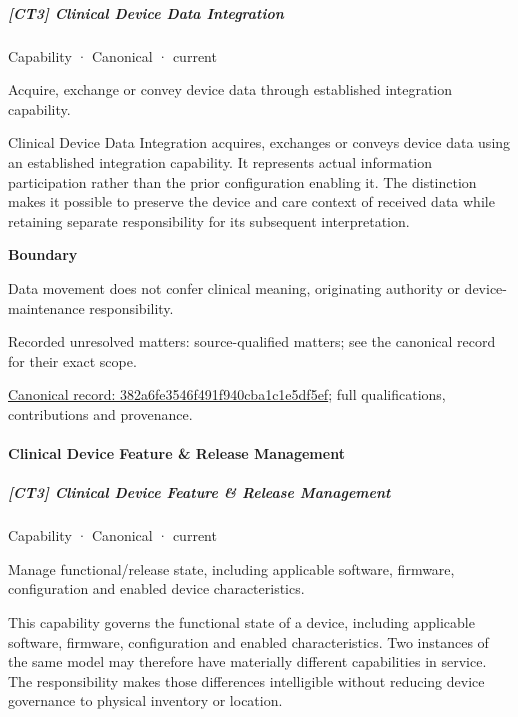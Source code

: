 \subparagraph{[CT3] Clinical Device Data Integration}

\label{element:382a6fe3546f491f940cba1c1e5df5ef}
{\small Capability · Canonical · current}\par

Acquire, exchange or convey device data through established integration capability.



Clinical Device Data Integration acquires, exchanges or conveys device data using an established integration capability. It represents actual information participation rather than the prior configuration enabling it. The distinction makes it possible to preserve the device and care context of received data while retaining separate responsibility for its subsequent interpretation.



\textbf{Boundary}



Data movement does not confer clinical meaning, originating authority or device-maintenance responsibility.


{\small Recorded unresolved matters: source-qualified matters; see the canonical record for their exact scope.}\par
{\footnotesize \href{../../../../continuum/strategy/capability/382a6fe3546f491f940cba1c1e5df5ef.md}{Canonical record: 382a6fe3546f491f940cba1c1e5df5ef}; full qualifications, contributions and provenance.}\par
\paragraph{Clinical Device Feature \& Release Management}

\subparagraph{[CT3] Clinical Device Feature \& Release Management}

\label{element:23d87ead4cdc40b785b006ca80f6d7b1}
{\small Capability · Canonical · current}\par

Manage functional/release state, including applicable software, firmware, configuration and enabled device characteristics.



This capability governs the functional state of a device, including applicable software, firmware, configuration and enabled characteristics. Two instances of the same model may therefore have materially different capabilities in service. The responsibility makes those differences intelligible without reducing device governance to physical inventory or location.



